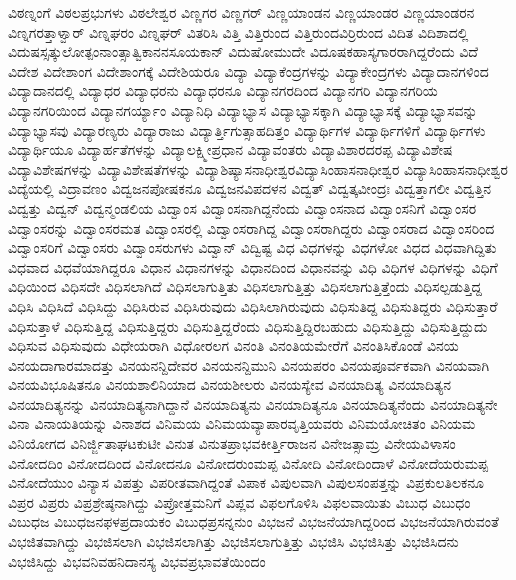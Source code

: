 {ವಿಠಣ್ನಂಗೆ
ವಿಠಲಪ್ರಭುಗಳು
ವಿಠಲೇಶ್ವರ
ವಿಣ್ಣಗರ
ವಿಣ್ಣಗರ್
ವಿಣ್ಣಯಾಂಡನ
ವಿಣ್ಣಯಾಂಡರ
ವಿಣ್ಣಯಾಂಡರನ
ವಿಣ್ನಗರತ್ತಾಳ್ವಾರ್
ವಿಣ್ನಘರಂ
ವಿಣ್ನಘರ್
ವಿತರಿಸಿ
ವಿತ್ತಿ
ವಿತ್ತಿರುಂದ
ವಿತ್ತಿರುಂದವಿರ್ರಿರುಂದ
ವಿದಿತ
ವಿದಿಶಾದಲ್ಲಿ
ವಿದುಷಸ್ಸತ್ಕುಲೋತ್ಪಂನಾಂತ್ಸಾತ್ವಿಕಾನನಸೂಯಕಾನ್
ವಿದುಷೋಮುದೇ
ವಿದೂಷಕಹಾಸ್ಯಗಾರರಾಗಿದ್ದರೆಂದು
ವಿದೆ
ವಿದೇಶ
ವಿದೇಶಾಂಗ
ವಿದೇಶಾಂಗಕ್ಕೆ
ವಿದೇಶಿಯರೂ
ವಿದ್ಯಾ
ವಿದ್ಯಾಕೆಂದ್ರಗಳನ್ನು
ವಿದ್ಯಾಕೇಂದ್ರಗಳು
ವಿದ್ಯಾದಾನಗಳಿಂದ
ವಿದ್ಯಾದಾನದಲ್ಲಿ
ವಿದ್ಯಾಧರ
ವಿದ್ಯಾಧರನು
ವಿದ್ಯಾಧರನೂ
ವಿದ್ಯಾನಗರದಿಂದ
ವಿದ್ಯಾನಗರಿ
ವಿದ್ಯಾನಗರಿಯ
ವಿದ್ಯಾನಗರಿಯಿಂದ
ವಿದ್ಯಾನಗರ್ಯ್ಯಾಂ
ವಿದ್ಯಾನಿಧಿ
ವಿದ್ಯಾಭ್ಯಾಸ
ವಿದ್ಯಾಭ್ಯಾಸಕ್ಕಾಗಿ
ವಿದ್ಯಾಭ್ಯಾಸಕ್ಕೆ
ವಿದ್ಯಾಭ್ಯಾಸವನ್ನು
ವಿದ್ಯಾಭ್ಯಾಸವು
ವಿದ್ಯಾರಣ್ಯರು
ವಿದ್ಯಾರಾಜು
ವಿದ್ಯಾರ್ತ್ತಿಗುತ್ಸಾಹದಿತ್ತಂ
ವಿದ್ಯಾರ್ಥಿಗಳ
ವಿದ್ಯಾರ್ಥಿಗಳಿಗೆ
ವಿದ್ಯಾರ್ಥಿಗಳು
ವಿದ್ಯಾರ್ಥಿಯೂ
ವಿದ್ಯಾರ್ಹತೆಗಳನ್ನು
ವಿದ್ಯಾಲಕ್ಷ್ಮೀಪ್ರಧಾನ
ವಿದ್ಯಾವಂತರು
ವಿದ್ಯಾವಿಶಾರದರಪ್ಪ
ವಿದ್ಯಾವಿಶೇಷ
ವಿದ್ಯಾವಿಶೇಷಗಳನ್ನು
ವಿದ್ಯಾವಿಶೇಷತೆಗಳನ್ನು
ವಿದ್ಯಾಶಿಷ್ಯಾಸನಾಧೀಶ್ವರವಿದ್ಯಾಸಿಂಹಾಸನಾಧೀಶ್ವರ
ವಿದ್ಯಾಸಿಂಹಾಸನಾಧೀಶ್ವರ
ವಿದ್ಯೆಯಲ್ಲಿ
ವಿದ್ರಾವಣಂ
ವಿದ್ವಜನಪೋಷಕನೂ
ವಿದ್ವಜನವಿಪದಳನ
ವಿದ್ವತ್
ವಿದ್ವತ್ಕವೀಂದ್ರಃ
ವಿದ್ವತ್ತಾಗಲೀ
ವಿದ್ವತ್ತಿನ
ವಿದ್ವತ್ತು
ವಿದ್ವನ್
ವಿದ್ವನ್ಮಂಡಲಿಯ
ವಿದ್ವಾಂಸ
ವಿದ್ವಾಂಸನಾಗಿದ್ದನೆಂದು
ವಿದ್ವಾಂಸನಾದ
ವಿದ್ವಾಂಸನಿಗೆ
ವಿದ್ವಾಂಸರ
ವಿದ್ವಾಂಸರನ್ನು
ವಿದ್ವಾಂಸರಮತ
ವಿದ್ವಾಂಸರಲ್ಲಿ
ವಿದ್ವಾಂಸರಾಗಿದ್ದ
ವಿದ್ವಾಂಸರಾಗಿದ್ದರು
ವಿದ್ವಾಂಸರಾದ
ವಿದ್ವಾಂಸರಿಂದ
ವಿದ್ವಾಂಸರಿಗೆ
ವಿದ್ವಾಂಸರು
ವಿದ್ವಾಂಸರುಗಳು
ವಿದ್ವಾನ್
ವಿದ್ವಿಷ್ಟ
ವಿಧ
ವಿಧಗಳನ್ನು
ವಿಧಗಳೋ
ವಿಧದ
ವಿಧವಾಗಿದ್ದಿತು
ವಿಧವಾದ
ವಿಧವೆಯಾಗಿದ್ದರೂ
ವಿಧಾನ
ವಿಧಾನಗಳನ್ನು
ವಿಧಾನದಿಂದ
ವಿಧಾನವನ್ನು
ವಿಧಿ
ವಿಧಿಗಳ
ವಿಧಿಗಳನ್ನು
ವಿಧಿಗೆ
ವಿಧಿಯಿಂದ
ವಿಧಿಸದೇ
ವಿಧಿಸಲಾಗಿದೆ
ವಿಧಿಸಲಾಗುತ್ತಿತು
ವಿಧಿಸಲಾಗುತ್ತಿತ್ತು
ವಿಧಿಸಲಾಗುತ್ತಿತ್ತೆಂದು
ವಿಧಿಸಲ್ಪಡುತ್ತಿದ್ದ
ವಿಧಿಸಿ
ವಿಧಿಸಿದೆ
ವಿಧಿಸಿದ್ದು
ವಿಧಿಸಿರುವ
ವಿಧಿಸಿರುವುದು
ವಿಧಿಸಿಲಾಗಿರುವುದು
ವಿಧಿಸುತಿದ್ದ
ವಿಧಿಸುತಿದ್ದರು
ವಿಧಿಸುತ್ತಾರೆ
ವಿಧಿಸುತ್ತಾಳೆ
ವಿಧಿಸುತ್ತಿದ್ದ
ವಿಧಿಸುತ್ತಿದ್ದರು
ವಿಧಿಸುತ್ತಿದ್ದರೆಂದು
ವಿಧಿಸುತ್ತಿದ್ದಿರಬಹುದು
ವಿಧಿಸುತ್ತಿದ್ದು
ವಿಧಿಸುತ್ತಿದ್ದುದು
ವಿಧಿಸುವ
ವಿಧಿಸುವುದು
ವಿಧೇಯರಾಗಿ
ವಿಧೋರಲಗ
ವಿನಂತಿ
ವಿನಂತಿಯಮೇರೆಗೆ
ವಿನಂತಿಸಿಕೊಂಡೆ
ವಿನಯ
ವಿನಯದಾಗಾರಮಾದತ್ತು
ವಿನಯನನ್ದಿದೇವರ
ವಿನಯನನ್ದಿಮುನಿ
ವಿನಯಪರಂ
ವಿನಯಪೂರ್ವಕವಾಗಿ
ವಿನಯವಾಗಿ
ವಿನಯವಿಭೂಷಿತನೂ
ವಿನಯಶಾಲಿನಿಯಾದ
ವಿನಯಶೀಲರು
ವಿನಯಸ್ಯೇವ
ವಿನಯಾದಿತ್ಯ
ವಿನಯಾದಿತ್ಯನ
ವಿನಯಾದಿತ್ಯನನ್ನು
ವಿನಯಾದಿತ್ಯನಾಗಿದ್ದಾನೆ
ವಿನಯಾದಿತ್ಯನು
ವಿನಯಾದಿತ್ಯನೂ
ವಿನಯಾದಿತ್ಯನೆಂದು
ವಿನಯಾದಿತ್ಯನೇ
ವಿನಾ
ವಿನಾಯತಿಯನ್ನು
ವಿನಾಶದ
ವಿನಿಮಯ
ವಿನಿಮಯವ್ಯಾಪಾರವೃತ್ತಿಯವರು
ವಿನಿಮಯೋಚಿತಂ
ವಿನಿಯಮ
ವಿನಿಯೋಗದ
ವಿನಿರ್ಜ್ಜಿತಾಘಟಕುಟೀ
ವಿನುತ
ವಿನುತಪ್ರಾಭವಕೀರ್ತ್ತಿರಾಜನ
ವಿನೇಜತ್ಸಾಮ್ರ
ವಿನೇಯವಿಳಾಸಂ
ವಿನೋದದಿಂ
ವಿನೋದದಿಂದ
ವಿನೋದನೂ
ವಿನೋದರುಂಮಪ್ಪ
ವಿನೋದಿ
ವಿನೋದಿಂದಾಳೆ
ವಿನೋದೆಯರುಮಪ್ಪ
ವಿನೋದೆಯುಂ
ವಿನ್ಯಾಸ
ವಿಪತ್ತು
ವಿಪರೀತವಾಗಿದ್ದಂತೆ
ವಿಪಾಕ
ವಿಪುಲವಾಗಿ
ವಿಪುಲಸಂಪತ್ತನ್ನು
ವಿಪ್ರಕುಲತಿಲಕನೂ
ವಿಪ್ರರ
ವಿಪ್ರರು
ವಿಪ್ರಶ್ರೇಷ್ಠನಾಗಿದ್ದು
ವಿಪ್ರೋತ್ತಮನಿಗೆ
ವಿಪ್ಲವ
ವಿಫಲಗೊಳಿಸಿ
ವಿಫಲವಾಯಿತು
ವಿಬುಧ
ವಿಬುಧಂ
ವಿಬುಧಜ
ವಿಬುಧಜನಫಳಪ್ರದಾಯಕಂ
ವಿಬುಧಪ್ರಸನ್ನನುಂ
ವಿಭಜನೆ
ವಿಭಜನೆಯಾಗಿದ್ದರಿಂದ
ವಿಭಜನೆಯಾಗಿರುವಂತೆ
ವಿಭಜಿತವಾಗಿದ್ದು
ವಿಭಜಿಸಲಾಗಿ
ವಿಭಜಿಸಲಾಗಿತ್ತು
ವಿಭಜಿಸಲಾಗುತ್ತಿತ್ತು
ವಿಭಜಿಸಿ
ವಿಭಜಿಸಿತ್ತು
ವಿಭಜಿಸಿದನು
ವಿಭಜಿಸಿದ್ದು
ವಿಭವನಿವಹನಿದಾನಸ್ಯ
ವಿಭವಪ್ರಭಾವತೆಯಿಂದಂ
}
